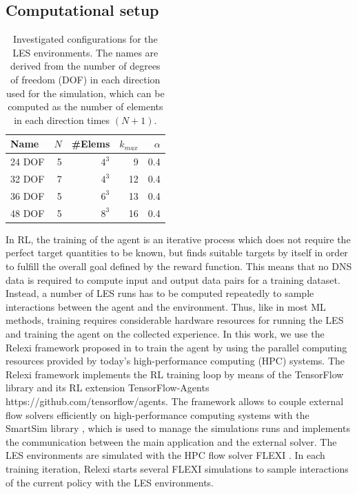 \subsection{Computational setup}
\label{sec:relexi}


\begin{table}[htb]
  \centering
  \begin{tabular}{lrrrr}
    \toprule
    Name   & $N$ & \#Elems & $k_{max}$ & $\alpha$ \\
    \midrule
    24 DOF &   5 &   $4^3$ &         9 &      0.4 \\
    32 DOF &   7 &   $4^3$ &        12 &      0.4 \\
    36 DOF &   5 &   $6^3$ &        13 &      0.4 \\
    48 DOF &   5 &   $8^3$ &        16 &      0.4 \\
    \bottomrule
  \end{tabular}
  \caption{Investigated configurations for the LES environments. The names are derived from the number of degrees of freedom (DOF) in each direction used for the simulation, which can be computed as the number of elements in each direction times $(N+1)$.}
  \label{tab:les_configs}
\end{table}

In RL, the training of the agent is an iterative process which does not require the perfect target quantities to be known, but finds suitable targets by itself in order to fulfill the overall goal defined by the reward function.
This means that no DNS data is required to compute input and output data pairs for a training dataset.
Instead, a number of LES runs has to be computed repeatedly to sample interactions between the agent and the environment.
Thus, like in most ML methods, training requires considerable hardware resources for running the LES and training the agent on the collected experience.
In this work, we use the Relexi framework proposed in \cite{kurz2022deep,kurz2022relexi} to train the agent by using the parallel computing resources provided by today's high-performance computing (HPC) systems.
The Relexi framework implements the RL training loop by means of the TensorFlow library \cite{abadi2016tensorflow} and its RL extension TensorFlow-Agents https://github.com/tensorflow/agents.
The framework allows to couple external flow solvers efficiently on high-performance computing systems with the SmartSim library \cite{partee2021using}, which is used to manage the simulations runs and implements the communication between the main application and the external solver.
The LES environments are simulated with the HPC flow solver FLEXI \cite{krais2021flexi}.
In each training iteration, Relexi starts several FLEXI simulations to sample interactions of the current policy with the LES environments.

